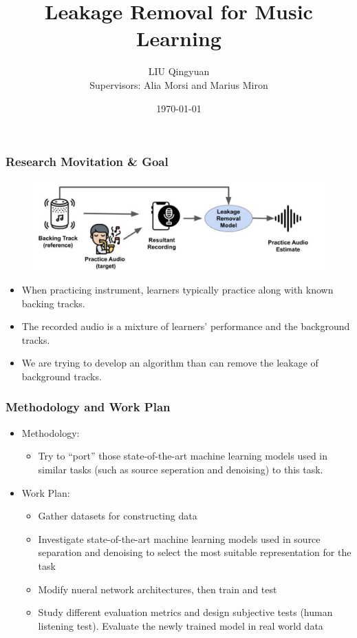 \documentclass{beamer}
\title{Leakage Removal for Music Learning}
\author[LIU Qingyuan]{LIU Qingyuan\\Supervisors: Alia Morsi and Marius Miron}
\institute{ASPLAB 1 and 2, Music Technology Group, Universitat Pompeu Fabra}
\date{\AdvanceDate \today}
\begin{document}
\frame{\titlepage}

\begin{frame}
\frametitle{Research Movitation \& Goal}
\begin{figure}[t]
\centering
\includegraphics[width=\linewidth]{demo.png}
\end{figure}
\begin{itemize}
\item When practicing instrument, learners typically practice along with known backing tracks.
\item The recorded audio is a mixture of learners' performance and the background tracks.
\item We are trying to develop an algorithm than can remove the leakage of background tracks.
\end{itemize}
\end{frame}

\begin{frame}
\frametitle{Methodology and Work Plan}
\begin{itemize}
\item Methodology:
\begin{itemize}
\item Try to ``port'' those state-of-the-art machine learning models used in similar tasks (such as source seperation and denoising) to this task.
\end{itemize}

\item Work Plan:
\begin{itemize}
\item Gather datasets for constructing data
\item Investigate state-of-the-art machine learning models used in source separation and denoising to select the most suitable representation for the task
\item Modify nueral network architectures, then train and test
\item Study different evaluation metrics and design subjective tests (human listening test). Evaluate the newly trained model in real world data
\end{itemize}
\end{itemize}
\end{frame}
\end{document}
